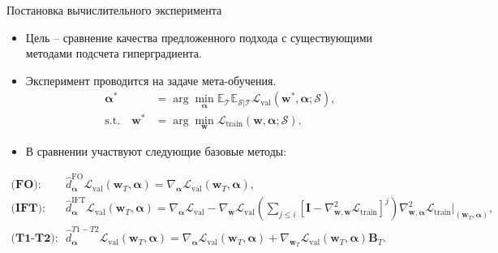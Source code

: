 \documentclass[aspectratio=169]{beamer}
\def\ltrn{\mathcal{L}_{\mathrm{train}}}
\def\lval{\mathcal{L}_{\mathrm{val}}}
\newcommand{\vect}[1]{\boldsymbol{\mathbf{#1}}}
\begin{document}
\begin{frame}{Постановка вычислительного эксперимента}
  \begin{itemize}
    \item Цель -- сравнение качества предложенного подхода с существующими методами подсчета гиперградиента.
    \item Эксперимент проводится на задаче мета-обучения.
    \begin{align*}
      \vect{\alpha}^* &= \arg\min_{\vect{\alpha}}\mathbb{E}_{\mathcal{T}}\mathbb{E}_{\mathcal{S}|\mathcal{T}}\lval(\vect{w}^*, \vect{\alpha}; \mathcal{S}),\\
      \mathrm{s.t.} \quad \vect{w}^* &= \arg\min_{\vect{w}}\ltrn(\vect{w}, \vect{\alpha};\mathcal{S}).
    \end{align*}
    \item В сравнении участвуют следующие базовые методы:
  \end{itemize}
  \begin{small}
  \begin{align*}
    \textbf{(FO)}: \quad &
    \hat{d}_{\vect{\alpha}}^\text{FO}\lval(\vect{w}_T, \vect{\alpha}) = \nabla_{\vect{\alpha}}\lval(\vect{w}_T, \vect{\alpha}),\\
    \textbf{(IFT)}: \quad &
    \hat{d}_{\vect{\alpha}}^\text{IFT}\lval(\vect{w}_T, \vect{\alpha}) =
    \nabla_{\vect{\alpha}}\lval - \nabla_{\vect{w}}\lval\left(\sum_{j\leq i}\left[\vect{I} - \nabla^2_{\vect{w},\vect{w}}\ltrn\right]^j\right)\nabla^2_{\vect{w},\vect{\alpha}}\ltrn\bigg\vert_{(\vect{w}_T, \vect{\alpha})},\\
    \textbf{(T1-T2)}: \quad &\hat{d}_{\vect{\alpha}}^{T1-T2}\lval(\vect{w}_T, \vect{\alpha}) = \nabla_{\vect{\alpha}}\lval(\vect{w}_T, \vect{\alpha}) + \nabla_{\vect{w}_T}\lval(\vect{w}_T, \vect{\alpha})\vect{B}_T.
  \end{align*}
  \end{small}

  
\end{frame}
\end{document}
